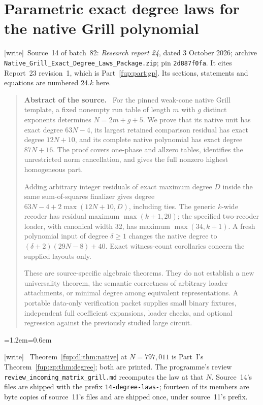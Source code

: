 \documentclass[11pt,letterpaper]{article}
\newcommand{\fupR}{0}
\renewcommand{\thesection}{\fupR.\arabic{section}}
\renewcommand{\theHsection}{\fupR.\arabic{section}}
\newcommand{\fupstart}[2]{%
  \renewcommand{\fupR}{#1}\setcounter{section}{0}\setcounter{equation}{0}%
  \renewcommand{\thesection}{\fupR.\arabic{section}}%
  \renewcommand{\theHsection}{\fupR.\arabic{section}}%
  \renewcommand{\fuphead}{#2}}
\newcommand{\fuphead}{Front matter}
\theoremstyle{definition}\newtheorem{definition}[theorem]{Definition}
\theoremstyle{remark}\newtheorem{remark}[theorem]{Remark}
\newcommand{\wtag}{\textup{[write]}}
\newenvironment{writenote}{\par\smallskip\begin{list}{}{\leftmargin=1.2em\rightmargin=0.6em}\item[]\small\wtag\ }{\end{list}\smallskip}
\newenvironment{sourceabstract}{\par\begin{quote}\small\textbf{Abstract of the source.}\ }{\end{quote}}
\newcommand{\rw}[1]{\nolinkurl{#1}}%
\begin{document}
\clearpage
\fupstart{24}{Part II: Report 24}
\part{Parametric exact degree laws for the native Grill polynomial}\label{fup:part:dl}
\noindent\wtag\ Source~14 of batch~82: \emph{Research report 24}, dated 3 October 2026; archive \rw{Native_Grill_Exact_Degree_Laws_Package.zip}; pin \texttt{2d887f0fa}. It cites Report~23 revision~1, which is Part~\ref{fup:part:gp}. Its sections, statements and equations are numbered 24.$k$ here.
\begin{sourceabstract}
For the pinned weak-cone native Grill template, a fixed nonempty run table of length $m$ with $g$ distinct exponents determines $N=2m+g+5$. We prove that its native unit has exact degree $63N-4$, its largest retained comparison residual has exact degree $12N+10$, and its complete native polynomial has exact degree $87N+16$. The proof covers one-phase and allzero tables, identifies the unrestricted norm cancellation, and gives the full nonzero highest homogeneous part.

Adding arbitrary integer residuals of exact maximum degree $D$ inside the same sum-of-squares finalizer gives degree $63N-4+2\max(12N+10,D)$, including ties. The generic $k$-wide recoder has residual maximum $\max(k+1,20)$; the specified two-recoder loader, with canonical width 32, has maximum $\max(34,k+1)$. A fresh polynomial input of degree $\delta\ge1$ changes the native degree to $(\delta+2)(29N-8)+40$. Exact witness-count corollaries concern the supplied layouts only.

These are source-specific algebraic theorems. They do not establish a new universality theorem, the semantic correctness of arbitrary loader attachments, or minimal degree among equivalent representations. A portable data-only verification packet supplies small binary fixtures, independent full coefficient expansions, loader checks, and optional regression against the previously studied large circuit.
\end{sourceabstract}
\begin{writenote}
Theorem~\ref{fup:dl:thm:native} at $N=797{,}011$ is Part~I's Theorem~\ref{fup:gp:thm:degree}; both are printed. The programme's review \rw{review_incoming_matrix_grill.md} recomputes the law at that $N$. Source~14's files are shipped with the prefix \texttt{14-degree-laws-}; fourteen of its members are byte copies of source~11's files and are shipped once, under source~11's prefix.
\end{writenote}
\end{document}
